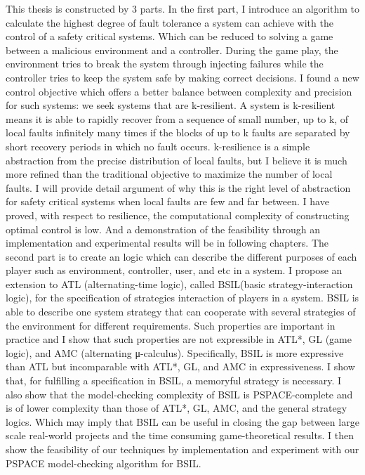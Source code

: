 \begin{abstractEN}

This thesis is constructed by 3 parts. 
In the first part, I introduce an algorithm to calculate the highest degree of fault tolerance a system can achieve with the control of a safety critical systems. Which can be reduced to solving a game between a malicious environment and a controller. During the game play, the environment tries to break the system through injecting failures while the controller tries to keep the system safe by making correct decisions. I found a new control objective which offers a better balance between complexity and precision for such systems: we seek systems that are k-resilient. A system is k-resilient means it is able to rapidly recover from a sequence of small number, up to k, of local faults infinitely many times if the blocks of up to k faults are separated by short recovery periods in which no fault occurs. k-resilience is a simple abstraction from the precise distribution of local faults, but I believe it is much more refined than the traditional objective to maximize the number of local faults. I will provide detail argument of why this is the right level of abstraction for safety critical systems when local faults are few and far between. I have proved, with respect to resilience, the computational complexity of constructing optimal control is low. And a demonstration of the feasibility through an implementation and experimental results will be in following chapters.
The second part is to create an logic which can describe the different purposes of each player such as environment, controller, user, and etc in a system. I propose an extension to ATL (alternating-time logic), called BSIL(basic strategy-interaction logic), for the specification of strategies interaction of players in a system. BSIL is able to describe one system strategy that can cooperate with several strategies of the environment for different requirements. Such properties are important in practice and I show that such properties are not expressible in ATL*, GL (game logic), and AMC (alternating μ-calculus). Specifically, BSIL is more expressive than ATL but incomparable with ATL*, GL, and AMC in expressiveness. I show that, for fulfilling a specification in BSIL, a memoryful strategy is necessary. I also show that the model-checking complexity of BSIL is PSPACE-complete and is of lower complexity than those of ATL*, GL, AMC, and the general strategy logics. Which may imply that BSIL can be useful in closing the gap between large scale real-world projects and the time consuming game-theoretical results. I then show the feasibility of our techniques by implementation and experiment with our PSPACE model-checking algorithm for BSIL.

\end{abstractEN}
